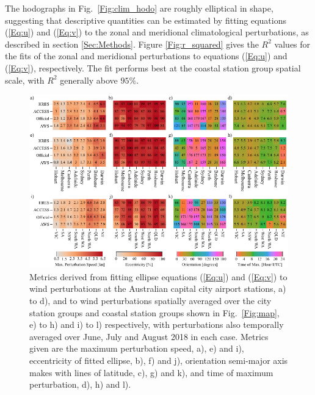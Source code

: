 \documentclass[twocol]{ametsoc}
\begin{document}
The hodographs in Fig.~\ref{Fig:clim_hodo} are roughly elliptical in shape, suggesting that descriptive quantities can be estimated by fitting equations (\ref{Eq:u}) and (\ref{Eq:v}) to the zonal and meridional climatological perturbations, as described in section \ref{Sec:Methods}. Figure \ref{Fig:r_squared} gives the $R^2$ values for the fits of the zonal and meridional perturbations to equations (\ref{Eq:u}) and (\ref{Eq:v}), respectively. The fit performs best at the coastal station group spatial scale, with $R^2$ generally above $95\%$. 

\begin{figure}
\centering
\includegraphics[width=39pc]{ellipse_fits.pdf}
\caption{Metrics derived from fitting ellipse equations (\ref{Eq:u}) and (\ref{Eq:v}) to wind perturbations at the Australian capital city airport stations, a) to d), and to wind perturbations spatially averaged over the city station groups and coastal station groups shown in Fig.~\ref{Fig:map}, e) to h) and i) to l) respectively, with perturbations also temporally averaged over June, July and August 2018 in each case. Metrics given are the maximum perturbation speed, a), e) and i), eccentricity of fitted ellipse, b), f) and j), orientation semi-major axis makes with lines of latitude, c), g) and k), and time of maximum perturbation, d), h) and l).}
\label{Fig:ellipse_fits}
\end{figure}
\end{document}

